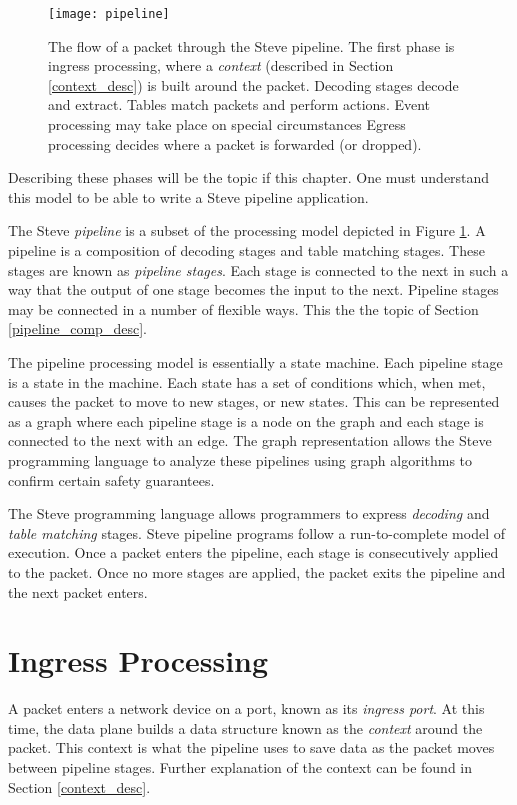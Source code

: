 \begin{figure} [ht] \texttt{[image: pipeline]}

\caption{The flow of a packet through the Steve pipeline. The first phase is
ingress processing, where a \textit{context} (described in Section
\ref{context_desc}) is built around the packet. Decoding stages decode and
extract. Tables match packets and perform actions. Event processing may take
place on special circumstances Egress processing decides where a packet is
forwarded (or dropped).} \label{fg:pipeline_model} 
\end{figure}

Describing these phases will be the topic if this chapter. One must understand this model to be able to write a Steve pipeline application.

The Steve \textit{pipeline} is a subset of the processing model depicted in Figure \ref{fg:pipeline_model}. A pipeline is a composition of decoding stages and table matching stages. These stages are known as \textit{pipeline stages}. Each stage is connected to the next in such a way that the output of
one stage becomes the input to the next. Pipeline stages may be connected in a number of flexible ways. This the the topic of Section \ref{pipeline_comp_desc}. 

The pipeline processing model is essentially a
state machine. Each pipeline stage is a state in the machine. Each state has a
set of conditions which, when met, causes the packet to move to new stages, or
new states. This can be represented as a graph where each pipeline stage is a
node on the graph and each stage is connected to the next with an edge. The graph representation allows the Steve programming language to analyze these
pipelines using graph algorithms to confirm certain safety guarantees.

The Steve programming language allows programmers to express
\textit{decoding} and \textit{table matching} stages.
Steve pipeline programs follow a run-to-complete model of execution. Once a
packet enters the pipeline, each stage is consecutively applied to
the packet. Once no more stages are applied, the packet exits the pipeline and
the next packet enters.

\section{Ingress Processing} \label{ingress_desc}

A packet enters a network device on a port, known as its \textit{ingress port}.
At this time, the data plane builds a data structure known as the
\textit{context} around the packet. This context is what the pipeline uses to
save data as the packet moves between pipeline stages. Further explanation of the
context can be found in Section \ref{context_desc}.

